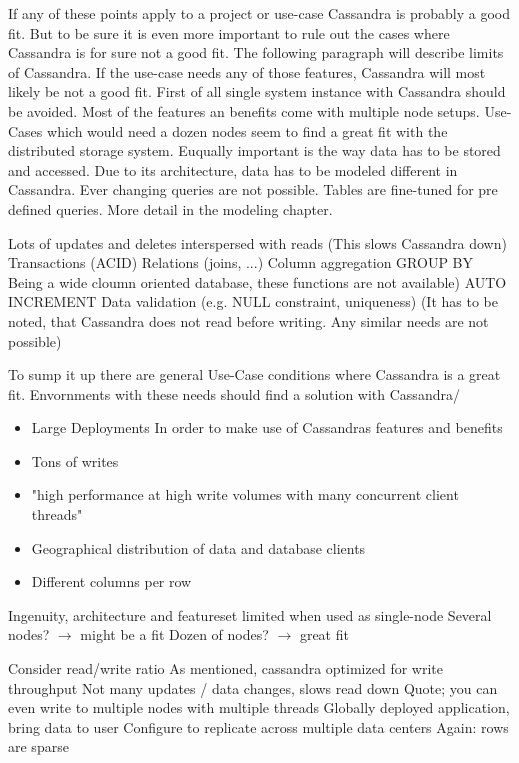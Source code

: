 If any of these points apply to a project or use-case Cassandra is probably a good fit.
But to be sure it is even more important to rule out the cases where Cassandra is for sure not a good fit.
The following paragraph will describe limits of Cassandra. If the use-case needs any of those features, Cassandra will most likely be not a good fit.
First of all single system instance with Cassandra should be avoided. Most of the features an benefits come with multiple node setups. Use-Cases which would need a dozen nodes seem to find a great fit with the distributed storage system.
Euqually important is the way data has to be stored and accessed. Due to its architecture, data has to be modeled different in Cassandra. Ever changing queries are not possible. Tables are fine-tuned for pre defined queries. More detail in the modeling chapter.



Lots of updates and deletes interspersed with reads (This slows Cassandra down)
 Transactions (ACID)
 Relations (joins, ...)
 Column aggregation GROUP BY
Being a wide cloumn oriented database, these functions are not available)
 {AUTO INCREMENT}
 Data validation (e.g. {NULL} constraint, uniqueness) (It has to be noted, that Cassandra does not read before writing. Any similar needs are not possible)

To sump it up there are general Use-Case conditions where Cassandra is a great fit.
Envornments with these needs should find a solution with Cassandra/
\begin{itemize}
    \item Large Deployments
    In order to make use of Cassandras features and benefits
    \item Tons of writes
        \item{"high performance at high write volumes with many concurrent client threads"}

    \item Geographical distribution of data and database clients
    \item Different columns per row
\end{itemize}
Ingenuity, architecture and featureset limited when used as single-node
 Several nodes? $\rightarrow$ might be a fit
 Dozen of nodes? $\rightarrow$ great fit

Consider read/write ratio
As mentioned, cassandra optimized for write throughput
Not many updates / data changes, slows read down
Quote; you can even write to multiple nodes with multiple threads
Globally deployed application, bring data to user
Configure to replicate across multiple data centers
Again: rows are sparse


